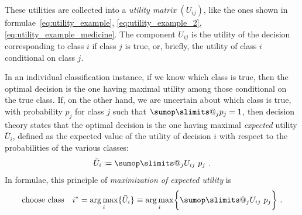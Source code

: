 \documentclass[\ifafour a4paper,12pt,\else a5paper,10pt,\fi%
onecolumn,oneside,article,%
british%
]{memoir}
\makeatletter
\theoremstyle{remark}
\theoremstyle{innote}
\def\sum{\DOTSI\sumop\slimits@}
\newcommand*{\mathte}[1]{\textbf{\textit{\textsf{#1}}}}
\newcommand*{\defd}{\coloneqq}
\DeclarePairedDelimiter\set{\{}{\}} %
\newcommand*{\p}{\mathrm{p}}%
\renewcommand*{\|}[1][]{\nonscript\:#1\vert\nonscript\:\mathopen{}}
\DeclareMathOperator*{\argmax}{arg\,max}
\newcommand*{\eu}{\bar{U}}
\makeatother
\begin{document}
These utilities are collected into a \emph{utility matrix} $(U_{ij})$, like the ones shown in formulae~\eqref{eq:utility_example}, \eqref{eq:utility_example_2}, \eqref{eq:utility_example_medicine}.
The component $U_{ij}$ is the utility of the decision corresponding to class $i$ if class $j$ is true, or, briefly, the utility of class $i$ conditional on class $j$.

In an individual classification instance, if we know which class is true, then the optimal decision is the one having maximal utility among those conditional on the true class. If, on the other hand, we are uncertain about which class is true, with probability $p_{j}$ for class $j$ such that $\sum_{j}p_{j}=1$, then decision theory states that the optimal decision is the one having maximal \emph{expected} utility $\eu_{i}$, defined as the expected value of the utility of decision $i$ with respect to the probabilities of the various classes:
\begin{equation}
  \label{eq:exp_utility}
  \eu_{i} \defd \sum_{j} U_{ij}\ p_{j} \ .
\end{equation}
In formulae, this principle of \emph{maximization of expected utility}  is
\begin{equation}
  \label{eq:max_expe_utility}
  \text{choose class}\quad
  i^{*} = \argmax_{i}\set{\eu_{i}} \equiv \argmax_{i}\set[\bigg]{\sum_{j} U_{ij}\ p_{j}} \ .
\end{equation}
\end{document}
